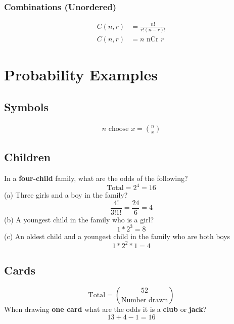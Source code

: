 \documentclass[twocolumn]{article}
\newcommand{\bd}{\textbf}
\begin{document}
	\subsubsection*{Combinations (Unordered)}
	\begin{align*}
		C(n, r) &= \frac{n!}{r!(n-r)!} \\
		C(n, r) &= n \text{ nCr } r
	\end{align*}
	\section{Probability Examples}
	\maketitle{}
	
	\subsection*{Symbols}
	\begin{align*}
		n \text{ choose } x = {n \choose x}
	\end{align*}
	
	\subsection*{Children}
	\par In a \bd{four-child} family, what are the odds of the following?
	\begin{equation*}
		\text{Total} = 2^4 = 16
	\end{equation*}
	(a) Three girls and a boy in the family?
	\begin{equation*}
		\frac{4!}{3!1!} = \frac{24}{6} = 4
	\end{equation*}
	(b) A youngest child in the family who is a girl?
	\begin{equation*}
		1 * 2^3 = 8
	\end{equation*}
	(c) An oldest child and a youngest child in the family who are both boys
	\begin{equation*}
		1 * 2^2 * 1 = 4
	\end{equation*}
	
	\subsection*{Cards}
	\begin{equation*}
		\text{Total} = {52 \choose \text{Number drawn}}
	\end{equation*}
	\noindent When drawing \bd{one card} what are the odds it is a \bd{club} or \bd{jack}?
	\begin{equation*}
		13 + 4 - 1 = 16
	\end{equation*}
	
\end{document}

